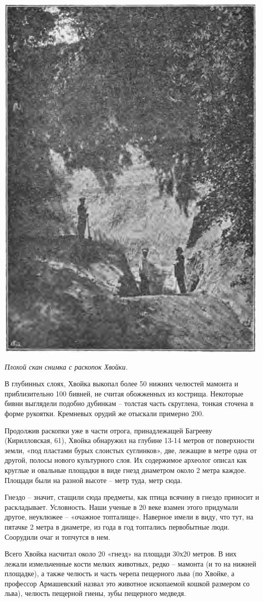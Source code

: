 \begin{center}
\includegraphics[width=0.60\linewidth]{chast-kirvys/kirstoy/hv-rask.png}

\textit{Плохой скан снимка с раскопок Хвойки.}
\end{center}

В глубинных слоях, Хвойка выкопал более 50 нижних челюстей мамонта и приблизительно 100 бивней, не считая обожженных из кострища. Некоторые бивни выглядели подобно дубинкам – толстая часть скруглена, тонкая сточена в форме рукоятки. Кремневых орудий же отыскали примерно 200.

Продолжив раскопки уже в части отрога, принадлежащей Багрееву (Кирилловская, 61), Хвойка обнаружил на глубине 13-14 метров от поверхности земли, «под пластами бурых слоистых суглинков», две, лежащие в метре одна от другой, полосы нового культурного слоя. Их содержимое археолог описал как круглые и овальные площадки в виде гнезд диаметром около 2 метра каждое. Площади были на разной высоте – метр туда, метр сюда.

Гнездо – значит, стащили сюда предметы, как птица всячину в гнездо приносит и раскладывает. Условность. Наши ученые в 20 веке взамен этого придумали другое, неуклюжее – «очажное топталище». Наверное имели в виду, что тут, на пятачке 2 метра в диаметре, из года в год топтались первобытные люди. Соорудили очаг и топчутся в нем.

Всего Хвойка насчитал около 20 «гнезд» на площади 30х20 метров. В них лежали измельченные кости мелких животных, редко – мамонта (и то на нижней площадке), а также челюсть и часть черепа пещерного льва (по Хвойке, а профессор Армашевский назвал это животное ископаемой кошкой размером со льва), челюсть пещерной гиены, зубы пещерного медведя.

